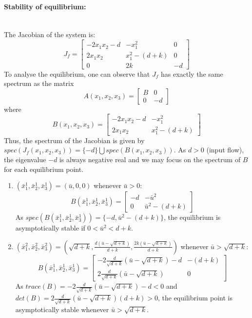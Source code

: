 \paragraph{Stability of equilibrium: }~\\
The Jacobian of the system is:
$$
J_f=\begin{bmatrix}
-2x_1x_2-d & -x_1^2 & 0\\
2x_1x_2 & x_1^2-(d+k) & 0\\
0 & 2k & -d
\end{bmatrix}
$$
To analyse the equilibrium, one can observe that $J_f$ has exactly the same spectrum as the matrix
$$ A(x_1,x_2,x_3)=\begin{bmatrix}
B & 0\\
0 & -d
\end{bmatrix}
$$
where
$$
B(x_1,x_2,x_3)=\begin{bmatrix}
-2x_1x_2-d & -x_1^2\\
2x_1x_2 & x_1^2-(d+k)
\end{bmatrix}
$$
Thus, the spectrum of the Jacobian is given by $spec(J_f(x_1,x_2,x_3))=\{-d\}\bigcup spec(B(x_1,x_2,x_3))$. As $d>0$ (input flow), the eigenvalue $-d$ is always negative real and we may focus on the spectrum of $B$ for each equilibrium point.

\begin{enumerate}
\item $(\bar{x}_1^1,\bar{x}_2^1,\bar{x}_3^1)=(\bar{u},0,0)$ whenever $\bar{u}>0$:
$$
B(\bar{x}_1^1,\bar{x}_2^1,\bar{x}_3^1)=\begin{bmatrix}
-d & -\bar{u}^2\\
0 & \bar{u}^2-(d+k)
\end{bmatrix}
$$
As $spec(B(\bar{x}_1^1,\bar{x}_2^1,\bar{x}_3^1))=\{-d,\bar{u}^2-(d+k)\}$, the equilibrium is asymptotically stable if $0<\bar{u}^2<d+k$.
\item $(\bar{x}_1^2,\bar{x}_2^2,\bar{x}_3^2)=(\sqrt{d+k},\frac{d(\bar{u}-\sqrt{d+k})}{d+k},\frac{2k(\bar{u}-\sqrt{d+k})}{d+k})$ whenever $\bar{u}>\sqrt{d+k}$:
$$
B(\bar{x}_1^1,\bar{x}_2^1,\bar{x}_3^1)=\begin{bmatrix}
-2\frac{d}{\sqrt{d+k}}(\bar{u}-\sqrt{d+k})-d & -(d+k)\\
2\frac{d}{\sqrt{d+k}}(\bar{u}-\sqrt{d+k}) & 0
\end{bmatrix}
$$
As $trace(B)=-2\frac{d}{\sqrt{d+k}}(\bar{u}-\sqrt{d+k})-d<0$ and $det(B)=2\frac{d}{\sqrt{d+k}}(\bar{u}-\sqrt{d+k})(d+k)>0$, the equilibrium point is asymptotically stable whenever $\bar{u}>\sqrt{d+k}$.
\end{enumerate}